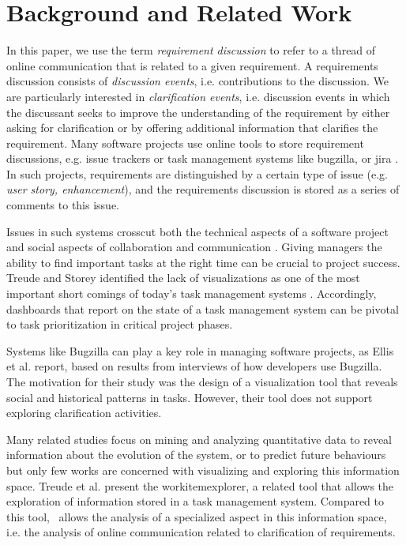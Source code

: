 \section{Background and Related Work}
In this paper, we use the term \emph{requirement discussion} to refer to a thread of online communication that is related to a given requirement. 
A requirements discussion consists of \emph{discussion events}, i.e. contributions to the discussion.
We are particularly interested in \emph{clarification events}, i.e. discussion events in which the discussant seeks to improve the understanding of the requirement by either asking for clarification or by offering additional information that clarifies the requirement.
Many software projects use online tools to store requirement discussions, e.g. issue trackers or task management systems like bugzilla, or jira \cite{Ernst2012}. 
In such projects, requirements are distinguished by a certain type of issue (e.g. \emph{user story, enhancement}), and the requirements discussion is stored as a series of comments to this issue.

Issues in such systems crosscut both the technical aspects of a software project and social aspects of collaboration and communication \cite{Kraut1995}. 
Giving managers the ability to find important tasks at the right time can be crucial to project success.
Treude and Storey identified the lack of visualizations as one of the most important short comings of today's task management systems \cite{Treude2010}. 
Accordingly, dashboards that report on the state of a task management system can be pivotal to task prioritization in critical project phases.

Systems like Bugzilla can play a key role in managing software projects, as Ellis et al. \cite{Ellis2007} report, based on results from interviews of how developers use Bugzilla. 
The motivation for their study was the design of a visualization tool that reveals social and historical patterns in tasks.
However, their tool does not support exploring clarification activities.

Many related studies focus on mining and analyzing quantitative data to reveal information about the evolution of the system, or to predict future behaviours but only few works are concerned with visualizing and exploring this information space. 
Treude et al. \cite{Treude2012} present the workitemexplorer, a related tool that allows the exploration of information stored in a task management system.
Compared to this tool, \viss\ allows the analysis of a specialized aspect in this information space, i.e. the analysis of online communication related to clarification of requirements. 